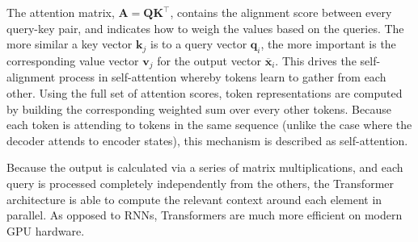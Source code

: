 The attention matrix, $\bm{A} = \bm{Q}\bm{K}^\top$, contains the alignment score between every query-key pair, and indicates how to weigh the values based on the queries. The more similar a key vector $\bm{k}_j$ is to a query vector $\bm{q}_i$, the more important is the corresponding value vector $\bm{v}_j$ for the output vector $\overline{\bm{x}}_i$. This drives the self-alignment process in self-attention whereby tokens learn to gather from each other. Using the full set of attention scores, token representations are computed by building the corresponding weighted sum over every other tokens. Because each token is attending to tokens in the same sequence (unlike the case where the decoder attends to encoder states), this mechanism is described as self-attention.



Because the output is calculated via a series of matrix multiplications, and each query is processed completely independently from the others, the Transformer architecture is able to compute the relevant context around each element in parallel. As opposed to \acp{RNN}, Transformers are much more efficient on modern GPU hardware. 

